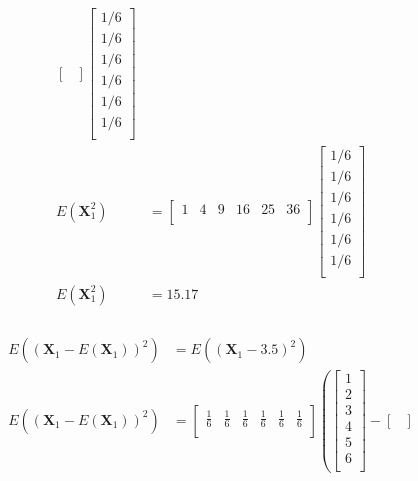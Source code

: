\documentclass[12pt,letterpaper, onecolumn]{exam}
\begin{document}
\begin{questions}
\begin{parts}
{\begin{subparts}
\begin{equation}
\begin{split}
\begin{bmatrix}
						\end{bmatrix}
						\begin{bmatrix}
							1/6 \\
							1/6 \\
							1/6 \\
							1/6 \\
							1/6 \\
							1/6 \\
						\end{bmatrix}\\
						E(\mathbf{X}_1^2) & =
						\begin{bmatrix}
							1 & 4 & 9 & 16 & 25 & 36 \\
						\end{bmatrix}
						\begin{bmatrix}
							1/6 \\
							1/6 \\
							1/6 \\
							1/6 \\
							1/6 \\
							1/6 \\
						\end{bmatrix}\\
						E(\mathbf{X}_1^2) & = 15.17\\
					\end{split}
				\end{equation}
				\\
				\solution
				\begin{equation}
					\begin{split}
						E\left((\mathbf{X}_1 - E(\mathbf{X}_1))^2\right) & = E\left((\mathbf{X}_1 - 3.5)^2\right)\\
						E\left((\mathbf{X}_1 - E(\mathbf{X}_1))^2\right) & =
						\begin{bmatrix}
							\frac{1}{6} & \frac{1}{6} & \frac{1}{6} & \frac{1}{6} & \frac{1}{6} & \frac{1}{6} \\
						\end{bmatrix}
						\left(
						\begin{bmatrix}
								1 \\
								2 \\
								3 \\
								4 \\
								5 \\
								6 \\
							\end{bmatrix} -
						\begin{bmatrix}

\end{bmatrix}
\end{split}
\end{equation}
\end{subparts}}
\end{parts}
\end{questions}
\end{document}
